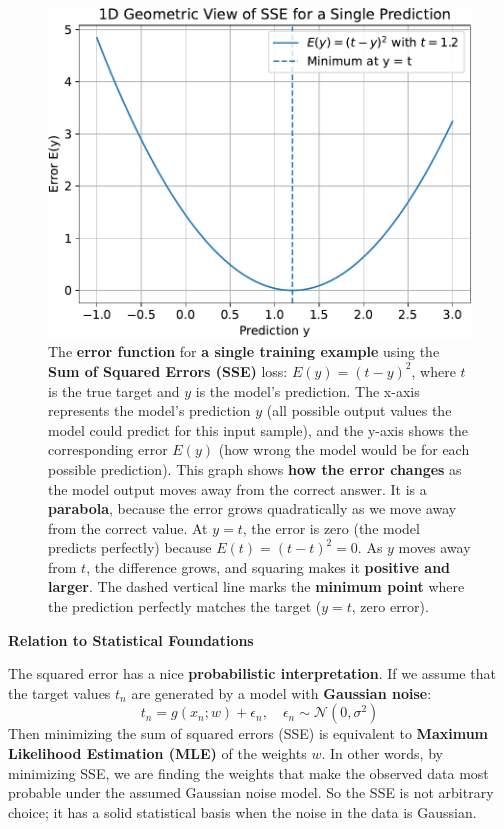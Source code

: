 \begin{figure}[!htp]
    \centering
    \includegraphics[width=.85\textwidth]{img/learning-and-optimization/error-geometric-interpretation-2.pdf}
    \caption{The \textbf{error function} for \textbf{a single training example} using the \textbf{Sum of Squared Errors (SSE)} loss: $E(y) = \left(t-y\right)^{2}$, where $t$ is the true target and $y$ is the model's prediction. The x-axis represents the model's prediction $y$ (all possible output values the model could predict for this input sample), and the y-axis shows the corresponding error $E(y)$ (how wrong the model would be for each possible prediction). This graph shows \textbf{how the error changes} as the model output moves away from the correct answer. It is a \textbf{parabola}, because the error grows quadratically as we move away from the correct value. At $y = t$, the error is zero (the model predicts perfectly) because $E(t) = (t - t)^2 = 0$. As $y$ moves away from $t$, the difference grows, and squaring makes it \textbf{positive and larger}. The dashed vertical line marks the \textbf{minimum point} where the prediction perfectly matches the target ($y = t$, zero error).}
\end{figure}

\begin{flushleft}
    \textcolor{Green3}{ \textbf{Relation to Statistical Foundations}}
\end{flushleft}
The squared error has a nice \textbf{probabilistic interpretation}. If we assume that the target values $t_{n}$ are generated by a model with \textbf{Gaussian noise}:
\begin{equation*}
    t_{n} = g(x_{n}; w) + \epsilon_{n}, \quad \epsilon_{n} \sim \mathcal{N}(0, \sigma^{2})
\end{equation*}
Then minimizing the sum of squared errors (SSE) is equivalent to \textbf{Maximum Likelihood Estimation (MLE)} of the weights $w$. In other words, by minimizing SSE, we are finding the weights that make the observed data most probable under the assumed Gaussian noise model. So the SSE is not arbitrary choice; it has a solid statistical basis when the noise in the data is Gaussian.
